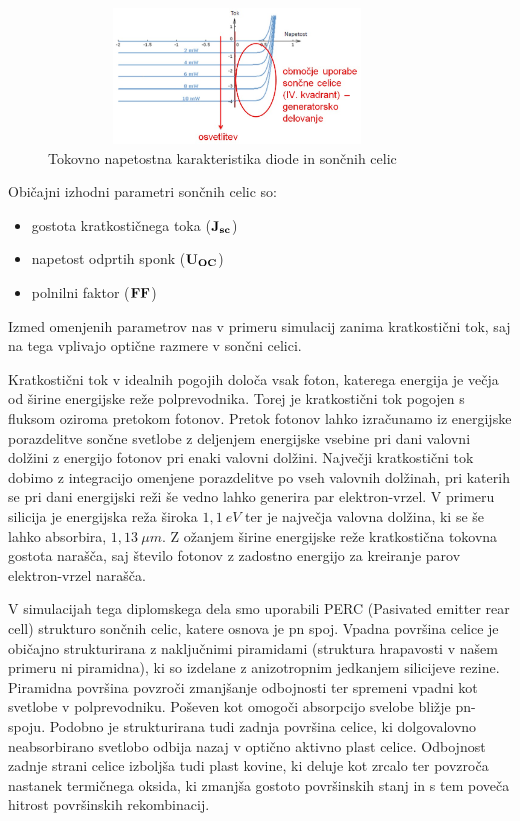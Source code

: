 \documentclass[a4paper,twoside,openright,12pt,slovene]{book}
\begin{document}
\begin{figure}[H]
    \centering
    \includegraphics[width=100mm, height=36mm]{Slike/characteristic.jpg}
    \caption{Tokovno napetostna karakteristika diode in sončnih celic \cite{predavanjaopto}}
    \label{fig:karakteristika}
\end{figure}

Običajni izhodni parametri sončnih celic so:
\begin{itemize}
    \item gostota kratkostičnega toka ($\bf J_{sc}$)
    \item napetost odprtih sponk ($\bf U_{OC}$)
    \item polnilni faktor ($\bf FF$)
\end{itemize}

Izmed omenjenih parametrov nas v primeru simulacij zanima kratkostični tok, saj na tega vplivajo optične razmere v sončni celici. \cite{polprevodniskaelektronika}

Kratkostični tok v idealnih pogojih določa vsak foton, katerega energija je večja od širine energijske reže polprevodnika. Torej je kratkostični tok pogojen s fluksom oziroma pretokom fotonov. Pretok fotonov lahko izračunamo iz energijske porazdelitve sončne svetlobe z deljenjem energijske vsebine pri dani valovni dolžini z energijo fotonov pri enaki valovni dolžini. Največji kratkostični tok dobimo z integracijo omenjene porazdelitve po vseh valovnih dolžinah, pri katerih se pri dani energijski reži še vedno lahko generira par elektron-vrzel. V primeru silicija je energijska reža široka $1,1\ eV$ ter je največja valovna dolžina, ki se še lahko absorbira, $1,13\ \mu m$. Z ožanjem širine energijske reže kratkostična tokovna gostota narašča, saj število fotonov z zadostno energijo za kreiranje parov elektron-vrzel narašča. 

V simulacijah tega diplomskega dela smo uporabili PERC (Pasivated emitter rear cell) strukturo sončnih celic, katere osnova je pn spoj. Vpadna površina celice je običajno strukturirana z naključnimi piramidami (struktura hrapavosti v našem primeru ni piramidna), ki so izdelane z anizotropnim jedkanjem silicijeve rezine. Piramidna površina povzroči zmanjšanje odbojnosti ter spremeni vpadni kot svetlobe v polprevodniku. Poševen kot omogoči absorpcijo svelobe bližje pn-spoju. Podobno je strukturirana tudi zadnja površina celice, ki dolgovalovno neabsorbirano svetlobo odbija nazaj v optično aktivno plast celice. Odbojnost zadnje strani celice izboljša tudi plast kovine, ki deluje kot zrcalo ter povzroča nastanek termičnega oksida, ki zmanjša gostoto površinskih stanj in s tem poveča hitrost površinskih rekombinacij. \cite{fotonskielementi}
\end{document}
